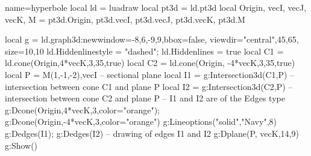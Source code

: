 \begin{luadraw}{name=hyperbole}
local ld = luadraw
local pt3d = ld.pt3d
local Origin, vecI, vecJ, vecK, M = pt3d.Origin, pt3d.vecI, pt3d.vecJ, pt3d.vecK, pt3d.M

local g = ld.graph3d:new{window={-8,6,-9,9},bbox=false, 
    viewdir={"central",45,65}, size={10,10}}
ld.Hiddenlinestyle = "dashed"; ld.Hiddenlines = true
local C1 = ld.cone(Origin,4*vecK,3,35,true)
local C2 = ld.cone(Origin, -4*vecK,3,35,true)
local P = {M(1,-1,-2),vecI} -- sectional plane
local I1 = g:Intersection3d(C1,P) -- intersection between cone C1 and plane P
local I2 = g:Intersection3d(C2,P) -- intersection between cone C2 and plane P
-- I1 and I2 are of the Edges type
g:Dcone(Origin,4*vecK,3,{color="orange"}); g:Dcone(Origin,-4*vecK,3,{color="orange"})
g:Lineoptions("solid","Navy",8)
g:Dedges(I1); g:Dedges(I2) -- drawing of edges I1 and I2
g:Dplane(P, vecK,14,9)
g:Show()
\end{luadraw}
